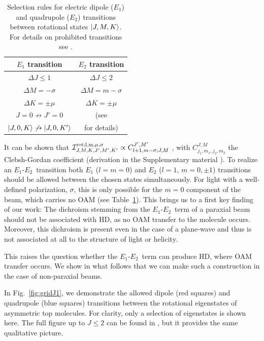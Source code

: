 \documentclass[reprint,aps,prl,twocolumn,superscriptaddress,groupedaddress]{revtex4-2}
\newcommand{\eoet}{$E_1$-$E_2$}
\begin{document}
\begin{table}[ht!]
    \centering
    \begin{tabular}{c c}\hline
    \toprule
        \textbf{$E_1$ transition} & \textbf{$E_2$ transition}  \\
        \midrule
        $\Delta J\leq 1$ &  $\Delta J\leq 2$ \\
        $\Delta M=-\sigma$ & $\Delta M=m-\sigma$ \\
        $\Delta K=\pm\mu$ & $\Delta K=\pm\mu$ \\
        $J=0\not\to J'=0$ &  (see \cite{Note1}\\
        $\ket{J,0,K}\not\to\ket{J,0,K'}$ &  for details)\\
    \bottomrule
\hline
    \end{tabular}
    \caption{Selection rules for electric dipole ($E_1$) and quadrupole ($E_2$) transitions between rotational states $\ket{J,M,K}$. For details on prohibited transitions see \cite{Note1}.}
    \label{SelectionRules}
\end{table}

It can be shown that $\mathcal{I}^{\rm rot; l, m, \mu, \sigma}_{J, M, K, J', M', K'} \propto C^{J',M'}_{l+1, m-\sigma; J, M}$ \cite{Maslov2024,Maslov_Thesis}, with $C^{J, M}_{j_1, m_1, j_2, m_2}$ the Clebsh-Gordan coefficient (derivation in the Supplementary material \cite{Note1}). To realize an \eoet ~transition both $E_1$ ($l=m=0$) and $E_2$ ($l = 1$, $m = 0, \pm 1$) transitions should be allowed between the chosen states simultaneously. For light with a well-defined polarization, $\sigma$, this is only possible for the $m = 0$ component of the beam, which carries no OAM (see Table~\ref{SelectionRules}). This brings us to a first key finding of our work: The dichroism stemming from the \eoet~term of a paraxial beam should not be associated with HD, as no OAM transfer to the molecule occurs. Moreover, this dichroism is present even in the case of a plane-wave and thus is not associated at all to the structure of light or helicity. 

This raises the question whether the \eoet~term can produce HD, where OAM transfer occurs. We show in what follows that we can make such a construction in the case of non-paraxial beams.




In Fig.~\ref{fig:gridJ1}, we demonstrate the allowed dipole (red squares) and quadrupole (blue squares) transitions between the rotational eigenstates of asymmetric top molecules. For clarity, only a selection of eigenstates is shown here. The full figure up to $J\leq 2$ can be found in \cite{Note1}, but it provides the same qualitative picture.
\end{document}
